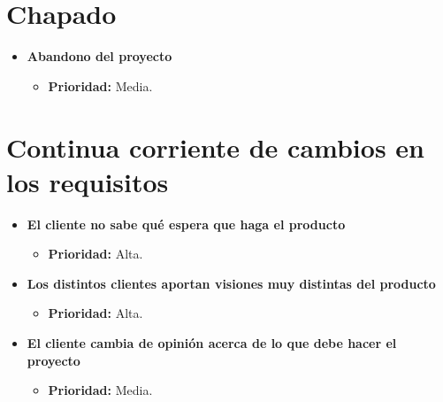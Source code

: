 \documentclass[spanish,a4paper,12pt]{report}	%
\begin{document}
\section{Chapado}
	\begin{itemize}
		\item \textbf{Abandono del proyecto}
			\begin{itemize}
				\item \textbf{Prioridad: }Media.			%
			\end{itemize}
	\end{itemize}
%
\section{Continua corriente de cambios en los requisitos}
	\begin{itemize}
		
		\item \textbf{El cliente no sabe qué espera que haga el producto}	%
			\begin{itemize}
				\item \textbf{Prioridad: }Alta.
			\end{itemize}
		
		\item \textbf{Los distintos clientes aportan visiones muy distintas del producto}	%
			\begin{itemize}
				\item \textbf{Prioridad: }Alta.
			\end{itemize}

		\item \textbf{El cliente cambia de opinión acerca de lo que debe hacer el proyecto}
			\begin{itemize}
				\item \textbf{Prioridad: }Media.
			\end{itemize}
	\end{itemize}
%
\end{document}
